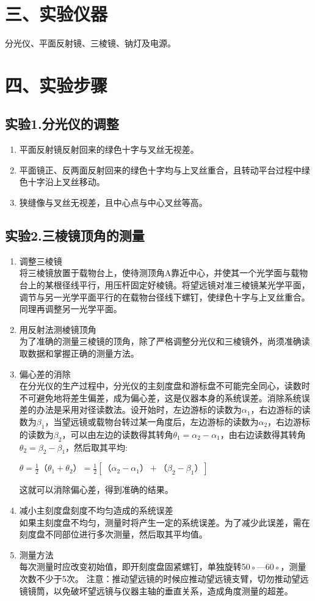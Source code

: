 \section*{三、实验仪器}
分光仪、平面反射镜、三棱镜、钠灯及电源。

\section*{四、实验步骤}
\subsection*{实验1.分光仪的调整}
\begin{enumerate}
\item 平面反射镜反射回来的绿色十字与叉丝无视差。
\item 平面镜正、反两面反射回来的绿色十字均与上叉丝重合，且转动平台过程中绿色十字沿上叉丝移动。
\item 狭缝像与叉丝无视差，且中心点与中心叉丝等高。
\end{enumerate}


\subsection*{实验2.三棱镜顶角的测量}
\begin{enumerate}
\item 调整三棱镜\\
将三棱镜放置于载物台上，使待测顶角A靠近中心，并使其一个光学面与载物台上的某根径线平行，用压杆固定好棱镜。将望远镜对准三棱镜某光学平面，调节与另一光学平面平行的在载物台径线下螺钉，使绿色十字与上叉丝重合。同理再调整另一光学平面。
\item 用反射法测棱镜顶角\\
为了准确的测量三棱镜的顶角，除了严格调整分光仪和三棱镜外，尚须准确读取数据和掌握正确的测量方法。
\item 偏心差的消除\\
在分光仪的生产过程中，分光仪的主刻度盘和游标盘不可能完全同心，读数时不可避免地将差生偏差，成为偏心差，这是仪器本身的系统误差。消除系统误差的办法是采用对径读数法。设开始时，左边游标的读数为$\alpha_1$，右边游标的读数为$\beta_1$，当望远镜或载物台转过某一角度后，左边游标的读数为$\alpha_2$，右边游标的读数为$\beta_2$，可以由左边的读数得其转角${\theta_1}={\alpha_2}-{\alpha_1}$，由右边读数得其转角${\theta_2}={\beta_2}-{\beta_1}$，然后取其平均:
\begin{center}
$\theta=\displaystyle\frac{1}{2}（{\theta_1}+{\theta_2}）=\displaystyle\frac{1}{2}[（{\alpha_2}-{\alpha_1}）+（{\beta_2}-{\beta_1}）]$
\end{center}
这就可以消除偏心差，得到准确的结果。
\item 减小主刻度盘刻度不均匀造成的系统误差\\
   如果主刻度盘不均匀，测量时将产生一定的系统误差。为了减少此误差，需在刻度盘不同部位进行多次测量，然后取其平均值。
\item 测量方法\\
每次测量时应改变初始值，即开刻度盘固紧螺钉，单独旋转50◦—60◦，测量次数不少于5次。
注意：推动望远镜的时候应推动望远镜支臂，切勿推动望远镜镜筒，以免破坏望远镜与仪器主轴的垂直关系，造成角度测量的超差。
\end{enumerate}

